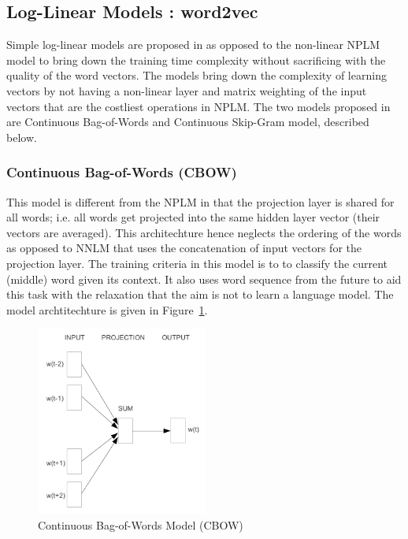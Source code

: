 \subsection{Log-Linear Models : word2vec}
\label{sec:word2vec}
Simple log-linear models are proposed in \cite{mikolov2013efficient} as opposed to the non-linear NPLM model to bring down the training time complexity without sacrificing with the quality of the word vectors.  The models bring down the complexity of learning vectors by not having a non-linear layer and matrix weighting of the input vectors that are the costliest operations in NPLM. The two models proposed in \cite{mikolov2013efficient} are Continuous Bag-of-Words and Continuous Skip-Gram model, described below.

\subsubsection{Continuous Bag-of-Words (CBOW)}
\label{sec:cbow}
This model is different from the NPLM in that the projection layer is shared for all words; i.e. all words get projected into the same hidden layer vector (their vectors are averaged). This architechture hence neglects the ordering of the words as opposed to NNLM that uses the concatenation of input vectors for the projection layer. The training criteria in this model is to to classify the current (middle) word given its context. It also uses word sequence from the future to aid this task with the relaxation that the aim is not to learn a language model. The model archtitechture is given in Figure~\ref{fig:nn:cbow}.
\begin{figure}[h!]
    \centering
        \includegraphics[width=0.5\textwidth]{figs/mikolov_cbow.png}
    \caption{Continuous Bag-of-Words Model (CBOW) }
    \label{fig:nn:cbow}
\end{figure}
